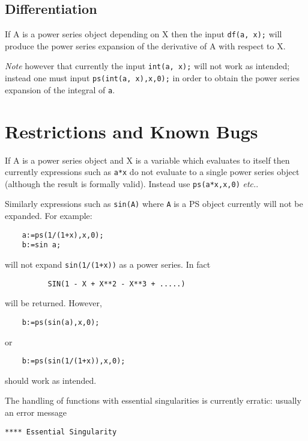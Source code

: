 \subsection{Differentiation}

If A is a power series object depending on X then the input
{\tt df(a, x);} will produce the power series expansion of the
derivative of A with respect to X.

{\em Note} however that currently the input  {\tt int(a, x);} will
not work as intended; instead one must input
{\tt ps(int(a, x),x,0);}
in order to obtain the power series expansion of the integral of
{\tt a}.

\section{Restrictions and Known Bugs}

If A is a power series object and X is a variable
which evaluates to itself then currently expressions such as {\tt a*x}
do not evaluate to a single power series object (although the
result is formally valid).  Instead use {\tt ps(a*x,x,0)} {\em etc.}.

Similarly expressions such as {\tt sin(A)} where {\tt A} is a PS object
currently will not be expanded. For example:

\begin{verbatim}
    a:=ps(1/(1+x),x,0);
    b:=sin a;
\end{verbatim}

will not expand {\tt sin(1/(1+x))} as a power series. In fact

\begin{verbatim}
          SIN(1 - X + X**2 - X**3 + .....)
\end{verbatim}

will be returned. However,

\begin{verbatim}
    b:=ps(sin(a),x,0);
\end{verbatim}

or

\begin{verbatim}
    b:=ps(sin(1/(1+x)),x,0);
\end{verbatim}

should work as intended.

The handling of functions with essential singularities is currently
erratic: usually an error message

\hspace*{2em} {\tt ***** Essential Singularity}

